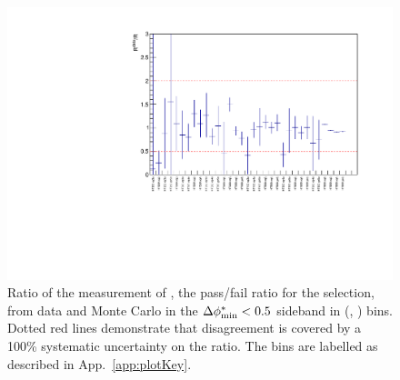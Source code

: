 \begin{figure}[h!]
  \begin{center}        
    \includegraphics[width=\textwidth]{figs/analysis/qcdMethod/doubleQcdSbSrRatio1D}
    \caption{ Ratio of the measurement of \rmhtmet, the pass/fail
    ratio for the \mhtmet selection, from data and Monte Carlo in the
    $\mbox{$\Delta\phi^{*}_{\rm min}$} < 0.5$ sideband in (\scalht, \njet) bins. Dotted red lines
    demonstrate that disagreement is covered by a 100\% systematic
    uncertainty on the ratio. The bins are
    labelled as described in App.~\ref{app:plotKey}.}
    \label{fig:RR_qcd}
  \end{center} 
\end{figure}





